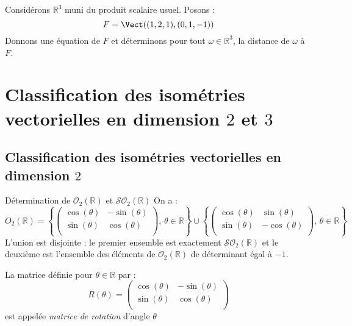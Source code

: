 \documentclass[french,11pt,twoside]{VcCours}
\begin{document}
\begin{Exemple}{} Considérons $\mathbb{R}^3$ muni du produit scalaire usuel. Posons :
$$ F = \Vect((1,2,1),(0,1,-1))$$
Donnons une équation de $F$ et déterminons pour tout $\omega \in \mathbb{R}^3$, la distance de $\omega$ à $F$.

\vspace*{6cm}
\end{Exemple}

\section{Classification des isométries vectorielles en dimension \texorpdfstring{$2$ et $3$}{2 et 3}}
\subsection{Classification des isométries vectorielles en dimension \texorpdfstring{$2$}{2}}

\begin{Theoreme}{Détermination de $\mathcal{O}_2(\mathbb{R})$ et $\mathcal{SO}_2(\mathbb{R})$}
On a :
$$ O_2(\mathbb{R}) = \left\lbrace \begin{pmatrix}
\cos(\theta) & - \sin(\theta) \\
\sin(\theta) & \cos(\theta) \\
\end{pmatrix}, \, \theta \in \mathbb{R} \right\rbrace \cup \left\lbrace \begin{pmatrix}
\cos(\theta) & \sin(\theta) \\
\sin(\theta) & -\cos(\theta) \\
\end{pmatrix}, \, \theta \in \mathbb{R} \right\rbrace$$
L'union est disjointe : le premier ensemble est exactement $\mathcal{SO}_2(\mathbb{R})$ et le deuxième est l'ensemble des éléments de $\mathcal{O}_2(\mathbb{R})$ de déterminant égal à $-1$.
\end{Theoreme}

\begin{Demonstration}{}
\vspace*{10cm}
\end{Demonstration}

\newpage

\begin{Notation}{} La matrice définie pour $\theta \in \mathbb{R}$ par :
$$ R(\theta) =\begin{pmatrix}
\cos(\theta) & - \sin(\theta) \\
\sin(\theta) & \cos(\theta) \\
\end{pmatrix}$$
est appelée \emph{matrice de rotation} d'angle $\theta$
\end{Notation}
\end{document}
